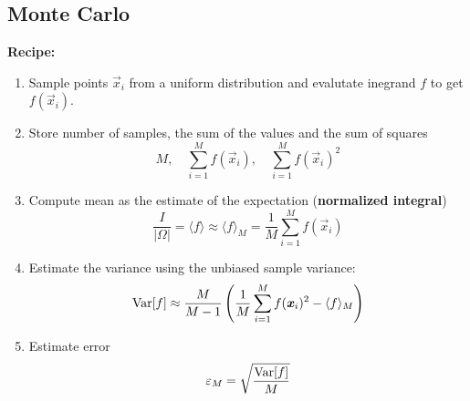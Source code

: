 \subsection{Monte Carlo}
    \textbf{Recipe:}
    \begin{enumerate}
        \item Sample points $\Vec{x}_i$ from a uniform distribution and evalutate inegrand $f$ to get $f(\Vec{x}_i)$.
        
        \item Store number of samples, the sum of the values and the sum of squares
        \begin{equation*}
            M, \quad \sum_{i=1}^M f(\Vec{x}_i), \quad \sum_{i=1}^M f(\Vec{x}_i)^2
        \end{equation*}
\vspace{-2mm}       
        \item Compute mean as the estimate of the expectation (\textbf{normalized integral})
        \begin{equation*}
            \frac{I}{|\Omega|} = \langle f \rangle \approx \langle f \rangle_M = \frac{1}{M}\sum_{i=1}^M f(\Vec{x}_i)
        \end{equation*}
\vspace{-2mm}        
        \item Estimate the variance using the unbiased sample variance:
        \begin{equation*}
            \textnormal{Var}[f] \approx \frac{M}{M-1}\left(\frac{1}{M}\sum_{i=1}^M f(\Vec{x}_i)^2-\langle f \rangle_M\right)
        \end{equation*}
\vspace{-2mm}       
        \item Estimate error
        \begin{equation*}
            \varepsilon_M = \sqrt{\frac{\textnormal{Var}[f]}{M}}
        \end{equation*}
    \end{enumerate}
    